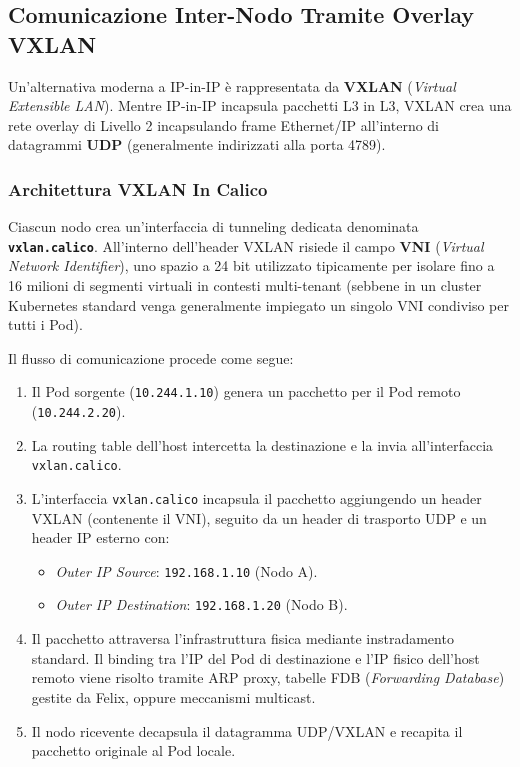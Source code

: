 \documentclass[11pt, a4paper]{article}
\begin{document}
\subsection{Comunicazione Inter-Nodo Tramite Overlay VXLAN}
Un'alternativa moderna a IP-in-IP è rappresentata da \textbf{VXLAN} (\emph{Virtual Extensible LAN}). Mentre IP-in-IP incapsula pacchetti L3 in L3, VXLAN crea una rete overlay di Livello 2 incapsulando frame Ethernet/IP all'interno di datagrammi \textbf{UDP} (generalmente indirizzati alla porta 4789).

\subsubsection{Architettura VXLAN In Calico}
Ciascun nodo crea un'interfaccia di tunneling dedicata denominata \textbf{\texttt{vxlan.calico}}. All'interno dell'header VXLAN risiede il campo \textbf{VNI} (\emph{Virtual Network Identifier}), uno spazio a 24 bit utilizzato tipicamente per isolare fino a 16 milioni di segmenti virtuali in contesti multi-tenant (sebbene in un cluster Kubernetes standard venga generalmente impiegato un singolo VNI condiviso per tutti i Pod).


Il flusso di comunicazione procede come segue:
\begin{enumerate}[noitemsep]
    \item Il Pod sorgente (\texttt{10.244.1.10}) genera un pacchetto per il Pod remoto (\texttt{10.244.2.20}).
    \item La routing table dell'host intercetta la destinazione e la invia all'interfaccia \texttt{vxlan.calico}.
    \item L'interfaccia \texttt{vxlan.calico} incapsula il pacchetto aggiungendo un header VXLAN (contenente il VNI), seguito da un header di trasporto UDP e un header IP esterno con:
    \begin{itemize}[noitemsep]
        \item \emph{Outer IP Source}: \texttt{192.168.1.10} (Nodo A).
        \item \emph{Outer IP Destination}: \texttt{192.168.1.20} (Nodo B).
    \end{itemize}
    \item Il pacchetto attraversa l'infrastruttura fisica mediante instradamento standard. Il binding tra l'IP del Pod di destinazione e l'IP fisico dell'host remoto viene risolto tramite ARP proxy, tabelle FDB (\emph{Forwarding Database}) gestite da Felix, oppure meccanismi multicast.
    \item Il nodo ricevente decapsula il datagramma UDP/VXLAN e recapita il pacchetto originale al Pod locale.
\end{enumerate}
\end{document}
